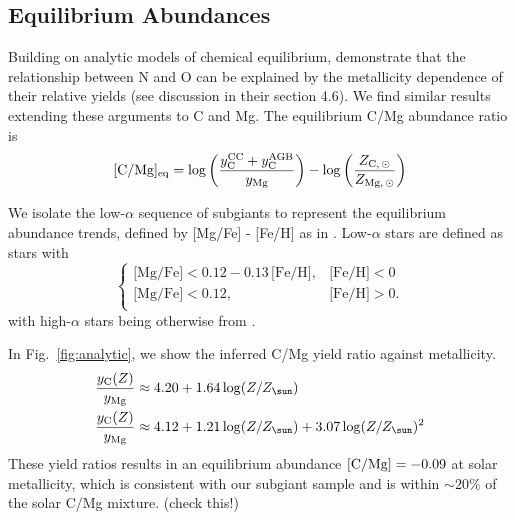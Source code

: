 \documentclass[fleqn,
usenatbib]{mnras}
\makeatletter
\newcommand{\Yct}{\ensuremath{y_{\rm C}}}
\newcommand{\Ycc}{\ensuremath{y_{\rm C}^{\rm CC}}}
\newcommand{\Ycagb}{\ensuremath{y_{\rm C}^{\rm AGB}}}
\newcommand{\Zo}{%
    \ifmmode Z_{\sun}%
    \else $Z_{\sun}$%
    \fi}
\newcommand{\about}[1]{${\sim} #1$}
\DeclareRobustCommand\citepos
  {\begingroup
   \let\NAT@nmfmt\NAT@posfmt%
   \NAT@swafalse\let\NAT@ctype\z@\NAT@partrue
   \@ifstar{\NAT@fulltrue\NAT@citetp}{\NAT@fullfalse\NAT@citetp}}
\let\NAT@orig@nmfmt\NAT@nmfmt
\def\NAT@posfmt#1{\NAT@orig@nmfmt{#1's}}
\makeatother
\begin{document}
\subsection{Equilibrium Abundances}\label{sec:equilibrium}

Building on \citepos{WAF17} analytic models of chemical equilibrium,
\citet{james+23} demonstrate that the relationship between N and O can be
explained by the metallicity dependence of their relative yields (see discussion
in their section 4.6).
We find similar results extending these arguments to C and Mg.
The equilibrium C/Mg abundance ratio is 
\begin{equation}\label{eq:equilibrium_yields}
    {\rm [C/Mg]_{eq}} = \log \left(\frac{\Ycc + \Ycagb }{y_{\rm Mg}}\right) - \log \left(\frac{Z_{\rm C,\,\odot}}{Z_{\rm Mg,\,\odot}}\right)
\end{equation}


We isolate the low-$\alpha$ sequence of subgiants to represent the equilibrium abundance trends, defined by [Mg/Fe] - [Fe/H] as in \citet{weinberg+19}.
Low-$\alpha$ stars are defined as stars with
\begin{equation}\label{eq:high_alpha}
\begin{cases}
\text{[Mg/Fe]} <0.12-0.13\,\text{[Fe/H]}, & \text{[Fe/H]}<0\\
\text{[Mg/Fe]} <0.12, & \text{[Fe/H]}>0. \\
\end{cases}
\end{equation}
with high-$\alpha$ stars being otherwise from \citet{weinberg+19, weinberg+22, emily+19, emily+21}.


In Fig.~\ref{fig:analytic}, we show the inferred C/Mg yield ratio against metallicity. 
\begin{subequations}\label{eq:yc_inferred}
    \begin{align}
        \frac{\Yct(Z)}{y_{\rm Mg}} &\approx 4.20 + 1.64 \log (Z/\Zo)\\
        \frac{\Yct(Z)}{y_{\rm Mg}} &\approx 4.12 + 1.21 \log(Z/\Zo) + 3.07 \log(Z/\Zo)^2
    \end{align}
\end{subequations}
These yield ratios results in an equilibrium abundance $[{\rm C/Mg}] = -0.09$ at solar metallicity, which is consistent with our subgiant sample and is within \about{20\%} of the solar C/Mg mixture. (check this!)
\end{document}
